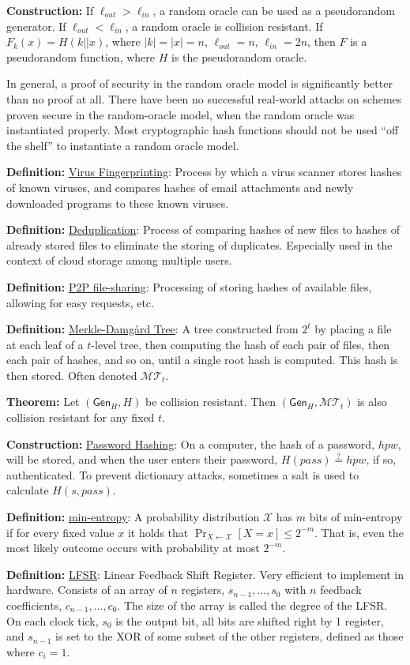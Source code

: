 \documentclass[10pt]{article}
\newcommand{\MMM}{\mathcal{M}}
\newcommand{\XXX}{\mathcal{X}}
\newcommand{\TTT}{\mathcal{T}}
\newcommand{\defn}[1]{{\bf Definition:} \underline{#1}}
\newcommand{\thm}[1]{{\bf Theorem:} \underline{#1}}
\newcommand{\con}[1]{{\bf Construction:} \underline{#1}}
\newcommand{\Gen}{\mathsf{Gen}}
\newcommand{\from}{\leftarrow}
\begin{document}
\begin{multicols}{5}
\con{} If $\ell_{out}>\ell_{in}$, a random oracle can be used as a pseudorandom generator. If $\ell_{out}<\ell_{in}$, a random oracle is collision resistant. If $F_k(x)=H(k||x)$, where $|k|=|x|=n$, $\ell_{out}=n$, $\ell_{in}=2n$, then $F$ is a pseudorandom function, where $H$ is the pseudorandom oracle.

In general, a proof of security in the random oracle model is significantly better than no proof at all. There have been no successful real-world attacks on schemes proven secure in the random-oracle model, when the random oracle was instantiated properly. Most cryptographic hash functions should not be used ``off the shelf'' to instantiate a random oracle model.

\defn{Virus Fingerprinting}: Process by which a virus scanner stores hashes of known viruses, and compares hashes of email attachments and newly downloaded programs to these known viruses.

\defn{Deduplication}: Process of comparing hashes of new files to hashes of already stored files to eliminate the storing of duplicates. Especially used in the context of cloud storage among multiple users.

\defn{P2P file-sharing}: Processing of storing hashes of available files, allowing for easy requests, etc.

\defn{Merkle-Damg\r{a}rd Tree}: A tree constructed from $2^t$ by placing a file at each leaf of a $t$-level tree, then computing the hash of each pair of files, then each pair of hashes, and so on, until a single root hash is computed. This hash is then stored. Often denoted $\MMM\TTT_t$.

\thm{}Let $(\Gen_H,H)$ be collision resistant. Then $(\Gen_H,\MMM\TTT_t)$ is also collision resistant for any fixed $t$.

\con{Password Hashing}: On a computer, the hash of a password, $hpw$, will be stored, and when the user enters their password, $H(pass)\overset{?}{=}hpw$, if so, authenticated. To prevent dictionary attacks, sometimes a salt is used to calculate $H(s,pass)$.

\defn{min-entropy}: A probability distribution $\XXX$ has $m$ bits of min-entropy if for every fixed value $x$ it holds that $\Pr_{X\from\XXX}[X=x]\leq2^{-m}$. That is, even the most likely outcome occurs with probability at most $2^{-m}$.

\defn{LFSR}: Linear Feedback Shift Register. Very efficient to implement in hardware. Consists of an array of $n$ registers, $s_{n-1},\dots,s_0$ with $n$ feedback coefficients, $c_{n-1},\dots,c_0$. The size of the array is called the degree of the LFSR. On each clock tick, $s_0$ is the output bit, all bits are shifted right by 1 register, and $s_{n-1}$ is set to the XOR of some subset of the other registers, defined as those where $c_i=1$.


\end{multicols}
\end{document}
